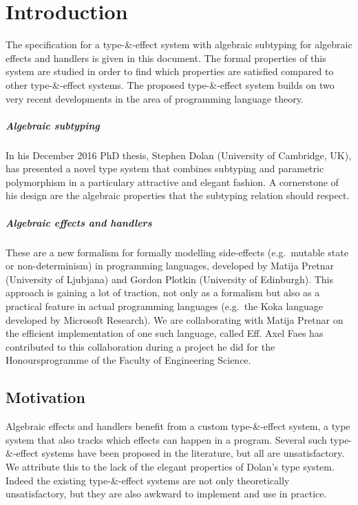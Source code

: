 \documentclass[master=cws,masteroption=ai, english]{kulemt}
\begin{document}
\mainmatter

\chapter{Introduction}\label{introduction}

The specification for a type-\&-effect system with algebraic subtyping
for algebraic effects and handlers is given in this document. The formal
properties of this system are studied in order to find which properties
are satisfied compared to other type-\&-effect systems. The proposed
type-\&-effect system builds on two very recent developments in the area
of programming language theory.

\paragraph{Algebraic subtyping}

In his December 2016 PhD thesis, Stephen Dolan (University of Cambridge,
UK), has presented a novel type system that combines subtyping and
parametric polymorphism in a particulary attractive and elegant fashion.
A cornerstone of his design are the algebraic properties that the
subtyping relation should respect.

\paragraph{Algebraic effects and handlers}

These are a new formalism for formally modelling side-effects
(e.g.~mutable state or non-determinism) in programming languages,
developed by Matija Pretnar (University of Ljubjana) and Gordon Plotkin
(University of Edinburgh). This approach is gaining a lot of traction,
not only as a formalism but also as a practical feature in actual
programming languages (e.g.~the Koka language developed by Microsoft
Research). We are collaborating with Matija Pretnar on the efficient
implementation of one such language, called Eff. Axel Faes has
contributed to this collaboration during a project he did for the
Honoursprogramme of the Faculty of Engineering Science.

\section{Motivation}\label{motivation}

Algebraic effects and handlers benefit from a custom type-\&-effect
system, a type system that also tracks which effects can happen in a
program. Several such type-\&-effect systems have been proposed in the
literature, but all are unsatisfactory. We attribute this to the lack of
the elegant properties of Dolan's type system. Indeed the existing
type-\&-effect systems are not only theoretically unsatisfactory, but
they are also awkward to implement and use in practice.
\end{document}

